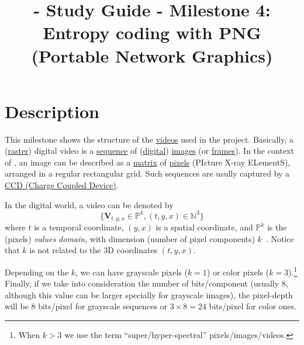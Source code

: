 
\title{\SM{} - Study Guide - Milestone 4: Entropy coding with PNG (Portable Network Graphics)}

\maketitle

\tableofcontents

\section{Description}

This milestone shows the structure of the
\href{https://en.wikipedia.org/wiki/Video}{videos} used in the
\theproject{} project. Basically, a
(\href{https://en.wikipedia.org/wiki/Raster_graphics}{raster}) digital video is
a \href{https://en.wikipedia.org/wiki/Sequence}{sequence} of
(\href{https://en.wikipedia.org/wiki/Digital_data}{digital})
\href{https://en.wikipedia.org/wiki/Image}{images} (or
\href{https://en.wikipedia.org/wiki/Film_frame}{frames}). In the
context of \theproject{}, an image can be described as a
\href{https://en.wikipedia.org/wiki/Matrix_(mathematics)}{matrix} of
\href{https://en.wikipedia.org/wiki/Pixel}{pixels} (PIcture X-ray
ELementS), arranged in a regular rectangular grid. Such sequences are
usully captured by a
\href{https://en.wikipedia.org/wiki/Charge-coupled_device}{CCD (Charge
  Coupled Device)}.

In the digital world, a video can be denoted by
\begin{equation*}
  \{{\mathbf V}_{t,y,x}\in\mathbb{P}^{k}, (t,y,x)\in\mathbb{N}^3\}
\end{equation*}
where $t$ is a temporal coordinate, $(y,x)$ is a spatial coordinate,
and $\mathbb{P}^{k}$ is the (pixels) \emph{values domain}, with
dimension (number of pixel components)
$k$~\cite{burger2016digital}. Notice that $k$ is not related to the 3D
coordinates $(t, y, x)$.

Depending on the $k$, we can have grayscale pixels ($k=1$) or color
pixels ($k=3$).\footnote{When $k>3$ we use the term
  ``super/hyper-spectral'' pixels/images/videos.} Finally, if we take
into consideration the number of bits/component (usually 8, although
this value can be larger specially for grayscale images), the
pixel-depth will be $8$ bits/pixel for grayscale sequences or
$3\times 8=24$ bits/pixel for color ones.

